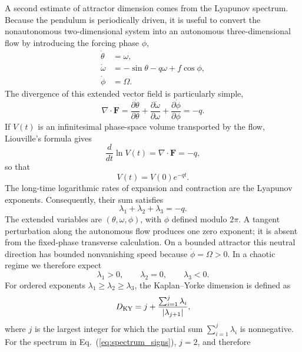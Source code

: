 \documentclass[aps,prb,reprint,floatfix]{revtex4-2}
\newcommand{\vect}[1]{\bm{#1}}
\begin{document}
A second estimate of attractor dimension comes from the Lyapunov spectrum. Because the pendulum is periodically driven, it is useful to convert the nonautonomous two-dimensional system into an autonomous three-dimensional flow by introducing the forcing phase $\phi$,
\begin{align}
 \dot\theta&=\omega,\label{eq:extended1}\\
 \dot\omega&=-\sin\theta-q\omega+f\cos\phi,\label{eq:extended2}\\
 \dot\phi&=\Omega.\label{eq:extended3}
\end{align}
The divergence of this extended vector field is particularly simple,
\begin{equation}
 \nabla\cdot\vect{F}=
 \frac{\partial\dot\theta}{\partial\theta}
 +\frac{\partial\dot\omega}{\partial\omega}
 +\frac{\partial\dot\phi}{\partial\phi}
 =-q.
\label{eq:divergence}
\end{equation}
If $V(t)$ is an infinitesimal phase-space volume transported by the flow, Liouville's formula gives
\begin{equation}
 \frac{d}{dt}\ln V(t)=\nabla\cdot\vect{F}=-q,
\label{eq:volume_contraction}
\end{equation}
so that
\begin{equation}
 V(t)=V(0)e^{-qt}.
\label{eq:volume_solution}
\end{equation}
The long-time logarithmic rates of expansion and contraction are the Lyapunov exponents. Consequently, their sum satisfies
\begin{equation}
 \lambda_1+\lambda_2+\lambda_3=-q.
\label{eq:sum_exponents}
\end{equation}
The extended variables are $(\theta,\omega,\phi)$, with $\phi$ defined modulo $2\pi$. A tangent perturbation along the autonomous flow produces one zero exponent; it is absent from the fixed-phase transverse calculation. On a bounded attractor this neutral direction has bounded nonvanishing speed because $\dot\phi=\Omega>0$. In a chaotic regime we therefore expect
\begin{equation}
 \lambda_1>0,\qquad \lambda_2=0,\qquad \lambda_3<0.
\label{eq:spectrum_signs}
\end{equation}
For ordered exponents $\lambda_1\geq\lambda_2\geq\lambda_3$, the Kaplan--Yorke dimension is defined as\cite{KaplanYorke1979}
\begin{equation}
 D_{\rm KY}=j+
 \frac{\sum_{i=1}^{j}\lambda_i}{|\lambda_{j+1}|},
\label{eq:kaplanyorke}
\end{equation}
where $j$ is the largest integer for which the partial sum $\sum_{i=1}^{j}\lambda_i$ is nonnegative. For the spectrum in Eq.~(\ref{eq:spectrum_signs}), $j=2$, and therefore
\end{document}
